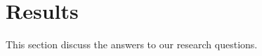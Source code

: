 \section{Results} \label{results}

This section discuss the answers to our research questions.





%
